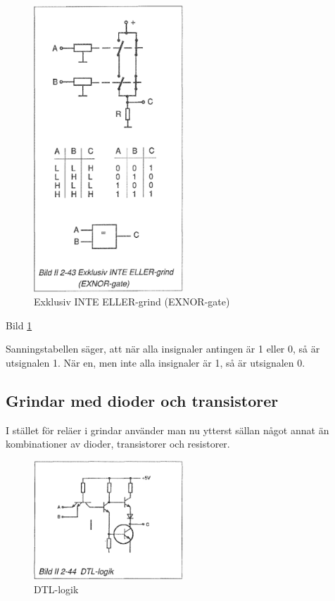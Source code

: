 \begin{figure}
\includegraphics[width=0.5\textwidth]{images/bild_2_2-43}
\caption{Exklusiv INTE ELLER-grind (EXNOR-gate)}
\label{fig:BildII2-43}
\end{figure}

Bild \ref{fig:BildII2-43}

Sanningstabellen säger, att när alla insignaler antingen är 1 eller 0, så är
utsignalen 1. När en, men inte alla insignaler är 1, så är utsignalen 0.

\subsection{Grindar med dioder och transistorer}

I stället för reläer i grindar använder man nu ytterst sällan något annat än
kombinationer av dioder, transistorer och resistorer.

\begin{figure}
\includegraphics[width=0.5\textwidth]{images/bild_2_2-44}
\caption{DTL-logik}
\label{fig:BildII2-44}
\end{figure}

